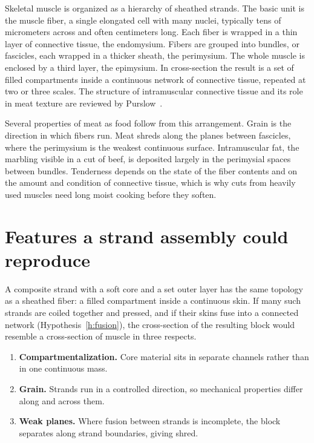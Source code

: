 \documentclass[11pt,openany]{book}
\theoremstyle{definition}
\begin{document}
Skeletal muscle is organized as a hierarchy of sheathed strands. The basic unit is the muscle fiber, a single elongated cell with many nuclei, typically tens of micrometers across and often centimeters long. Each fiber is wrapped in a thin layer of connective tissue, the endomysium. Fibers are grouped into bundles, or fascicles, each wrapped in a thicker sheath, the perimysium. The whole muscle is enclosed by a third layer, the epimysium. In cross-section the result is a set of filled compartments inside a continuous network of connective tissue, repeated at two or three scales. The structure of intramuscular connective tissue and its role in meat texture are reviewed by Purslow~\cite{purslow2005}.

Several properties of meat as food follow from this arrangement. Grain is the direction in which fibers run. Meat shreds along the planes between fascicles, where the perimysium is the weakest continuous surface. Intramuscular fat, the marbling visible in a cut of beef, is deposited largely in the perimysial spaces between bundles. Tenderness depends on the state of the fiber contents and on the amount and condition of connective tissue, which is why cuts from heavily used muscles need long moist cooking before they soften.

\section{Features a strand assembly could reproduce}

A composite strand with a soft core and a set outer layer has the same topology as a sheathed fiber: a filled compartment inside a continuous skin. If many such strands are coiled together and pressed, and if their skins fuse into a connected network (Hypothesis~\ref{h:fusion}), the cross-section of the resulting block would resemble a cross-section of muscle in three respects.

\begin{enumerate}
\item \textbf{Compartmentalization.} Core material sits in separate channels rather than in one continuous mass.
\item \textbf{Grain.} Strands run in a controlled direction, so mechanical properties differ along and across them.
\item \textbf{Weak planes.} Where fusion between strands is incomplete, the block separates along strand boundaries, giving shred.
\end{enumerate}
\end{document}
